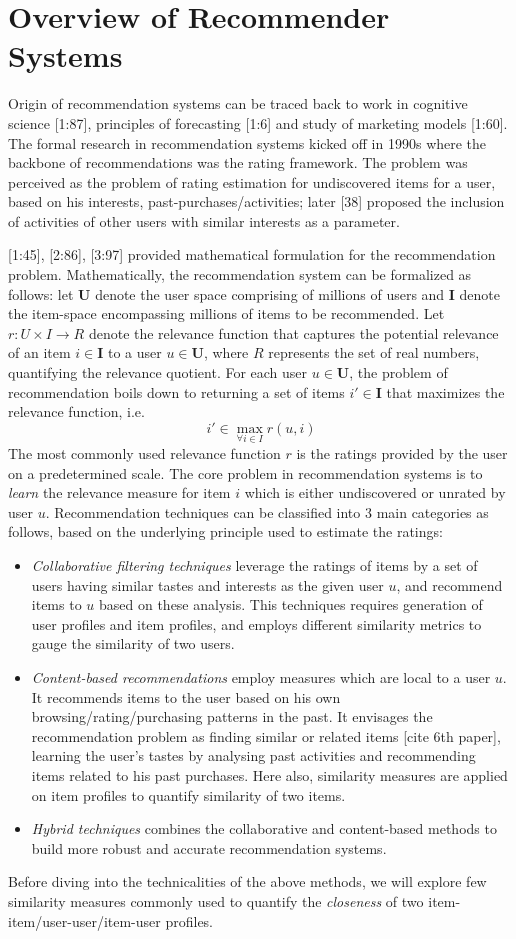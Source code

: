 \section{Overview of Recommender Systems}
Origin of recommendation systems can be traced back to work in cognitive science [1:87], principles of forecasting [1:6] and study of marketing models [1:60]. The formal research in recommendation systems kicked off in 1990s where the backbone of recommendations was the rating framework. The problem was perceived as the problem of rating estimation for undiscovered items for a user, based on his interests, past-purchases/activities; later [38] proposed the inclusion of activities of other users with similar interests as a parameter.

[1:45], [2:86], [3:97] provided mathematical formulation for the recommendation problem. Mathematically, the recommendation system can be formalized as follows: let $\textbf{U}$ denote the user space comprising of millions of users and $\textbf{I}$ denote the item-space encompassing millions of items to be recommended. Let $r:U\times I\rightarrow R$ denote the relevance function that captures the potential relevance of an item $i\in \textbf{I}$ to a user $u\in \textbf{U}$, where $R$ represents the set of real numbers, quantifying the relevance quotient. For each user $u\in \textbf{U}$, the problem of recommendation boils down to returning a set of items $i'\in \textbf{I}$ that maximizes the relevance function, i.e.
\begin{equation}
~i'\in\max_{\forall i\in I}r(u,i)
\end{equation}
The most commonly used relevance function $r$ is the ratings provided by the user on a predetermined scale. The core problem in recommendation systems is to \textit{learn} the relevance measure for item $i$ which is either undiscovered or unrated by user $u$. Recommendation techniques can be classified into 3 main categories as follows, based on the underlying principle used to estimate the ratings:
\begin{itemize}
\item \textit{Collaborative filtering techniques} leverage the ratings of items by a set of users having similar tastes and interests as the given user $u$, and recommend items to $u$ based on these analysis. This techniques requires generation of user profiles and item profiles, and employs different similarity metrics to gauge the similarity of two users. 
\item \textit{Content-based recommendations} employ measures which are local to a user $u$. It recommends items to the user based on his own browsing/rating/purchasing patterns in the past. It envisages the recommendation problem as finding similar or related items [cite 6th paper], learning the user's tastes by analysing past activities and recommending items related to his past purchases. Here also, similarity measures are applied on item profiles to quantify similarity of two items.
\item \textit{Hybrid techniques} combines the collaborative and content-based methods to build more robust and accurate recommendation systems.
\end{itemize}
Before diving into the technicalities of the above methods, we will explore few similarity measures commonly used to quantify the \textit{closeness} of two item-item/user-user/item-user profiles.